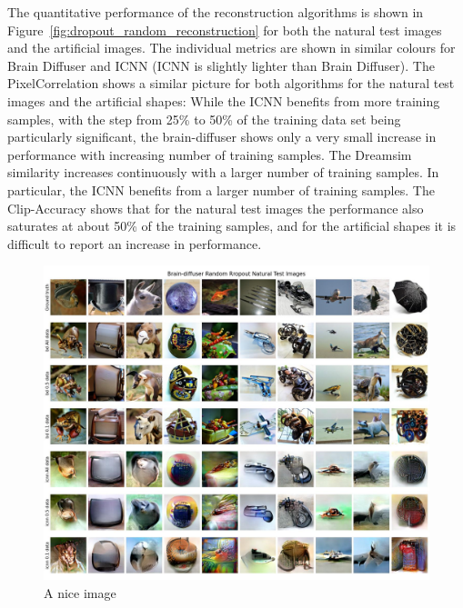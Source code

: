 The quantitative performance of the reconstruction algorithms is shown in Figure~\ref{fig:dropout_random_reconstruction} for both the natural test images and the artificial images. The individual metrics are shown in similar colours for Brain Diffuser and ICNN (ICNN is slightly lighter than Brain Diffuser). The PixelCorrelation shows a similar picture for both algorithms for the natural test images and the artificial shapes: While the ICNN benefits from more training samples, with the step from 25\% to 50\% of the training data set being particularly significant, the brain-diffuser shows only a very small increase in performance with increasing number of training samples. The Dreamsim similarity increases continuously with a larger number of training samples. In particular, the ICNN benefits from a larger number of training samples. The Clip-Accuracy shows that for the natural test images the performance also saturates at about 50\% of the training samples, and for the artificial shapes it is difficult to report an increase in performance.


\begin{figure}[ht]
    \centering
    \includegraphics[width=1\textwidth]{plots/dropout_qual_random_test.JPEG}
    \caption{A nice image}\label{fig:dropout_qual_random_test}
\end{figure}

